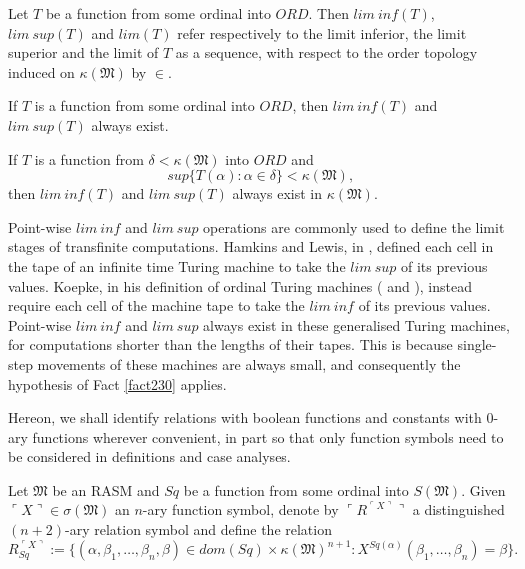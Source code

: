 \documentclass[12pt]{article}
\numberwithin{equation}{section}
\begin{document}
\begin{defi}
Let $T$ be a function from some ordinal into $ORD$. Then $lim \ inf (T)$, $lim \ sup (T)$ and $lim(T)$ refer respectively to the limit inferior, the limit superior and the limit of $T$ as a sequence, with respect to the order topology induced on $\kappa(\mathfrak{M})$ by $\in$.
\end{defi}

\begin{fact}
If $T$ is a function from some ordinal into $ORD$, then $lim \ inf (T)$ and $lim \ sup (T)$ always exist.
\end{fact}

\begin{fact}\label{fact230}
If $T$ is a function from $\delta < \kappa(\mathfrak{M})$ into $ORD$ and
\begin{equation*}
    sup \{T(\alpha) : \alpha \in \delta\} < \kappa(\mathfrak{M}) \text{,}
\end{equation*}
then $lim \ inf (T)$ and $lim \ sup (T)$ always exist in $\kappa(\mathfrak{M})$.
\end{fact}

Point-wise $lim \ inf$ and $lim \ sup$ operations are commonly used to define the limit stages of transfinite computations. Hamkins and Lewis, in \cite{ittm}, defined each cell in the tape of an infinite time Turing machine to take the $lim \ sup$ of its previous values. Koepke, in his definition of ordinal Turing machines (\cite{koepke1} and \cite{koepke2}), instead require each cell of the machine tape to take the $lim \ inf$ of its previous values. Point-wise $lim \ inf$ and $lim \ sup$ always exist in these generalised Turing machines, for computations shorter than the lengths of their tapes. This is because single-step movements of these machines are always small, and consequently the hypothesis of Fact \ref{fact230} applies.

Hereon, we shall identify relations with boolean functions and constants with $0$-ary functions wherever convenient, in part so that only function symbols need to be considered in definitions and case analyses. 

\begin{defi}
Let $\mathfrak{M}$ be an RASM and $Sq$ be a function from some ordinal into $S(\mathfrak{M})$. Given $\ulcorner X \urcorner \in \sigma(\mathfrak{M})$ an $n$-ary function symbol, denote by $\ulcorner R^{\ulcorner X \urcorner} \urcorner$ a distinguished $(n+2)$-ary relation symbol and define the relation 
\begin{equation*}
    R_{Sq}^{\ulcorner X \urcorner} := \{(\alpha, \beta_1, \dots, \beta_n, \beta) \in dom(Sq) \times \kappa(\mathfrak{M})^{n+1} : X^{Sq(\alpha)} (\beta_1, \dots, \beta_n) = \beta\} \text{.}
\end{equation*}
\end{defi}
\end{document}

